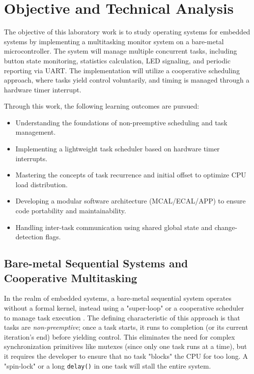 \newpage

\tableofcontents

\newpage

\section{Objective and Technical Analysis}

The objective of this laboratory work is to study operating systems for embedded systems by implementing a multitasking monitor system on a bare-metal microcontroller. The system will manage multiple concurrent tasks, including button state monitoring, statistics calculation, LED signaling, and periodic reporting via UART. The implementation will utilize a cooperative scheduling approach, where tasks yield control voluntarily, and timing is managed through a hardware timer interrupt.

Through this work, the following learning outcomes are pursued:
\begin{itemize}
    \item Understanding the foundations of non-preemptive scheduling and task management.
    \item Implementing a lightweight task scheduler based on hardware timer interrupts.
    \item Mastering the concepts of task recurrence and initial offset to optimize CPU load distribution.
    \item Developing a modular software architecture (MCAL/ECAL/APP) to ensure code portability and maintainability.
    \item Handling inter-task communication using shared global state and change-detection flags.
\end{itemize}

\subsection{Bare-metal Sequential Systems and Cooperative Multitasking}

In the realm of embedded systems, a bare-metal sequential system operates without a formal kernel, instead using a "super-loop" or a cooperative scheduler to manage task execution \cite{arduino_multitasking}. The defining characteristic of this approach is that tasks are \textit{non-preemptive}; once a task starts, it runs to completion (or its current iteration's end) before yielding control. This eliminates the need for complex synchronization primitives like mutexes (since only one task runs at a time), but it requires the developer to ensure that no task "blocks" the CPU for too long. A "spin-lock" or a long \texttt{delay()} in one task will stall the entire system.

